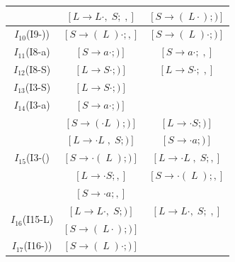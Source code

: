 \documentclass[12pt]{ctexart}
\begin{document}
\begin{table}
\begin{tabular}{|c|cc|}
            & $[L \to L \cdot,\;S;\;,]$ & $[S \to (\;L \cdot ); )]$ \\ \hline
            \multirow{1}{*}{$I_{10}$(I9-))} & $[S \to (\;L\;)\cdot; ,]$ & $[S \to (\;L\;)\cdot; )]$ \\ \hline
            \multirow{1}{*}{$I_{11}$(I8-a)} & $[S \to a\cdot; )]$ & $[S \to a\cdot;\;,]$ \\ \hline
            \multirow{1}{*}{$I_{12}$(I8-S)} & $[L \to S\cdot;)]$ & $[L \to S\cdot;\;,]$ \\ \hline
            \multirow{1}{*}{$I_{13}$(I3-S)} & $[L \to S\cdot;)]$ & \\ \hline
            \multirow{1}{*}{$I_{14}$(I3-a)} & $[S \to a\cdot;)]$ & \\ \hline
            \multirow{5}{*}{$I_{15}$(I3-()} & $[S \to (\cdot L\;);)]$ & $[L \to \cdot S;)]$ \\
             & $[L \to \cdot L\;,\;S;)]$ & $[S \to \cdot a; )]$ \\
             & $[S \to \cdot (\;L\;); )]$ & $[L \to \cdot L\;,\;S; ,]$ \\
             & $[L \to \cdot S; ,]$ & $[S \to \cdot (\;L\;); ,]$ \\
             & $[S \to \cdot a; ,]$ & \\ \hline
            \multirow{2}{*}{$I_{16}$(I15-L)} & $[L \to L \cdot,\;S; )]$ & $[L \to L \cdot,\;S;\;,]$ \\
             & $[S \to (\;L \cdot ); )]$ & \\ \hline
            \multirow{1}{*}{$I_{17}$(I16-))} & $[S \to (\;L\;)\cdot; )]$ & \\ \hline
        \end{tabular}
    \end{table}
\end{document}
